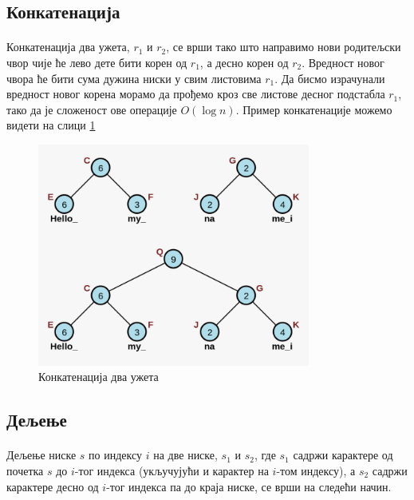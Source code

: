 \documentclass[12pt,oneside]{memoir}
\begin{document}
\subsection{Конкатенација}
\paragraph{}
Конкатенација два ужета, \(r_1\) и \(r_2\), се врши тако што направимо нови родитељски чвор
чије ће лево дете бити корен од \(r_1\), а десно корен од  \(r_2\). Вредност новог чвора ће
бити сума дужина ниски у свим листовима \(r_1\). Да бисмо израчунали вредност новог корена
морамо да прођемо кроз све листове десног подстабла \(r_1\), тако да је сложеност ове 
операције \(O(\log{}n)\). Пример конкатенације можемо видети на слици \ref{fig:rope_concat}

\begin{figure}
  \centering
  \includegraphics[width=0.8\textwidth]{images/rope_concat.png}
  \caption{Конкатенација два ужета}
  \label{fig:rope_concat}
\end{figure}

\subsection{Дељење}
\paragraph{}
Дељење ниске \(s\) по индексу \(i\) на две ниске, \(s_1\) и \(s_2\),
где \(s_1\) садржи карактере од почетка  \(s\) до \(i\)-тог индекса (укључујући и карактер на 
\(i\)-том индексу), а \(s_2\) садржи карактере десно од \(i\)-тог индекса па до краја ниске,
се врши на следећи начин.
\end{document}

